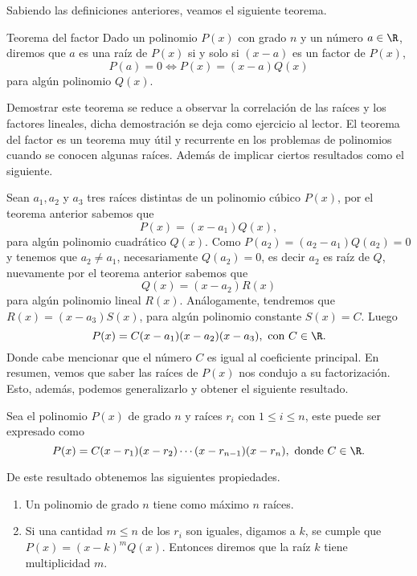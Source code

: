 Sabiendo las definiciones anteriores, veamos el siguiente teorema.

\begin{theorem.tcb}{Teorema del factor}{}\label{factor-theorem}
Dado un polinomio $P(x)$ con grado $n$ y un número $a \in \R$, diremos que $a$ es una raíz de $P(x)$ si y solo si $(x - a)$ es un factor de $P(x)$, \ie
\[
    P(a) = 0 \iff P(x) = (x - a)Q(x)
\]
para algún polinomio $Q(x)$.
\end{theorem.tcb}
Demostrar este teorema se reduce a observar la correlación de las raíces y los factores lineales, dicha demostración se deja como ejercicio al lector.
El teorema del factor es un teorema muy útil y recurrente en los problemas de polinomios cuando se conocen algunas raíces.
Además de implicar ciertos resultados como el siguiente.

Sean $a_1, a_2$ y $a_3$ tres raíces distintas de un polinomio cúbico $P(x)$, por el teorema anterior sabemos que
\[
    P(x) = (x - a_1)Q(x),
\]
para algún polinomio cuadrático $Q(x)$.
Como $P(a_2) = (a_2 - a_1)Q(a_2) = 0$ y tenemos que $a_2 \neq a_1$, necesariamente $Q(a_2) = 0$, es decir $a_2$ es raíz de $Q$, nuevamente por el teorema anterior sabemos que
\[
    Q(x) = (x - a_2)R(x)
\]
para algún polinomio lineal $R(x)$.
Análogamente, tendremos que $R(x) = (x - a_3)S(x)$, para algún polinomio constante $S(x) = C$.
Luego
\[
    P(x) = C(x - a_1)(x - a_2)(x - a_3),\ \text{con}\  C \in \R.
\]
Donde cabe mencionar que el número $C$ es igual al coeficiente principal.
En resumen, vemos que saber las raíces de $P(x)$ nos condujo a su factorización.
Esto, además, podemos generalizarlo y obtener el siguiente resultado.
\begin{remark.tcb}
    Sea el polinomio $P(x)$ de grado $n$ y raíces $r_i$ con $1 \leq i \leq n$, este puede ser expresado como
    \begin{equation}
        P(x) = C(x - r_1)(x - r_2)\cdots(x - r_{n-1})(x - r_n), \ \text{donde}\ C \in \R.
    \end{equation}
\end{remark.tcb}
De este resultado obtenemos las siguientes propiedades.
\begin{enumerate}
    \item Un polinomio de grado $n$ tiene como máximo $n$ raíces.
    \item Si una cantidad $m \leq n$ de los $r_i$ son iguales, digamos a $k$, se cumple que $P(x) = (x - k)^m Q(x)$.
    Entonces diremos que la raíz $k$ tiene multiplicidad $m$.
\end{enumerate}

